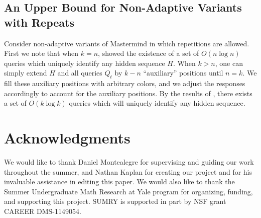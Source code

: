 \documentclass[12pt, a4paper]{article}
\begin{document}
\subsection{An Upper Bound for Non-Adaptive Variants with Repeats}
Consider non-adaptive variants of Mastermind in which repetitions are allowed. First we note that when $k=n$, \cite{DS13} showed the existence of a set of $O(n \log n)$ queries which uniquely identify any hidden sequence $H$. When $k > n$, one can simply extend $H$ and all queries $Q_t$ by $k - n$ ``auxiliary'' positions until $n = k$. We fill these auxiliary positions with arbitrary colors, and we adjust the responses accordingly to account for the auxiliary positions. By the results of \cite{DS13}, there exists a set of $O(k \log k)$ queries which will uniquely identify any hidden sequence.

\section{Acknowledgments}
We would like to thank Daniel Montealegre for supervising and guiding our work throughout the summer, and Nathan Kaplan for creating our project and for his invaluable assistance in editing this paper. 
 We would also like to thank the Summer Undergraduate Math Research at Yale program for organizing, funding, and supporting this project. SUMRY is supported in part by NSF grant CAREER DMS-1149054.
\medskip


\end{document}
